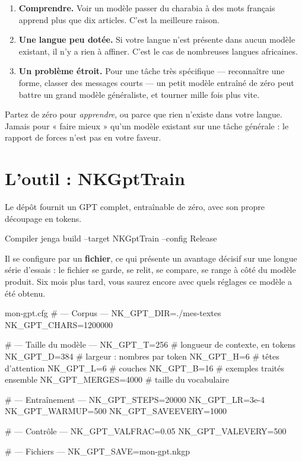 \begin{enumerate}
  \item \textbf{Comprendre.} Voir un modèle passer du charabia à des mots
        français apprend plus que dix articles. C'est la meilleure raison.
  \item \textbf{Une langue peu dotée.} Si votre langue n'est présente dans aucun
        modèle existant, il n'y a rien à affiner. C'est le cas de nombreuses
        langues africaines.
  \item \textbf{Un problème étroit.} Pour une tâche très spécifique — reconnaître
        une forme, classer des messages courts — un petit modèle entraîné de
        zéro peut battre un grand modèle généraliste, et tourner mille fois plus
        vite.
\end{enumerate}

\begin{nkretenir}
Partez de zéro pour \emph{apprendre}, ou parce que rien n'existe dans votre
langue. Jamais pour « faire mieux » qu'un modèle existant sur une tâche
générale : le rapport de forces n'est pas en votre faveur.
\end{nkretenir}

\section{L'outil : NKGptTrain}

Le dépôt fournit un GPT complet, entraînable de zéro, avec son propre découpage
en tokens.

\begin{nkcode}[]{Compiler}
jenga build --target NKGptTrain --config Release
\end{nkcode}

Il se configure par un \textbf{fichier}, ce qui présente un avantage décisif sur
une longue série d'essais : le fichier se garde, se relit, se compare, se range
à côté du modèle produit. Six mois plus tard, vous saurez encore avec quels
réglages ce modèle a été obtenu.

\begin{nkcode}[]{mon-gpt.cfg}
# --- Corpus ---
NK_GPT_DIR=./mes-textes
NK_GPT_CHARS=1200000

# --- Taille du modèle ---
NK_GPT_T=256        # longueur de contexte, en tokens
NK_GPT_D=384        # largeur : nombres par token
NK_GPT_H=6          # têtes d'attention
NK_GPT_L=6          # couches
NK_GPT_B=16         # exemples traités ensemble
NK_GPT_MERGES=4000  # taille du vocabulaire

# --- Entraînement ---
NK_GPT_STEPS=20000
NK_GPT_LR=3e-4
NK_GPT_WARMUP=500
NK_GPT_SAVEEVERY=1000

# --- Contrôle ---
NK_GPT_VALFRAC=0.05
NK_GPT_VALEVERY=500

# --- Fichiers ---
NK_GPT_SAVE=mon-gpt.nkgp
\end{nkcode}


